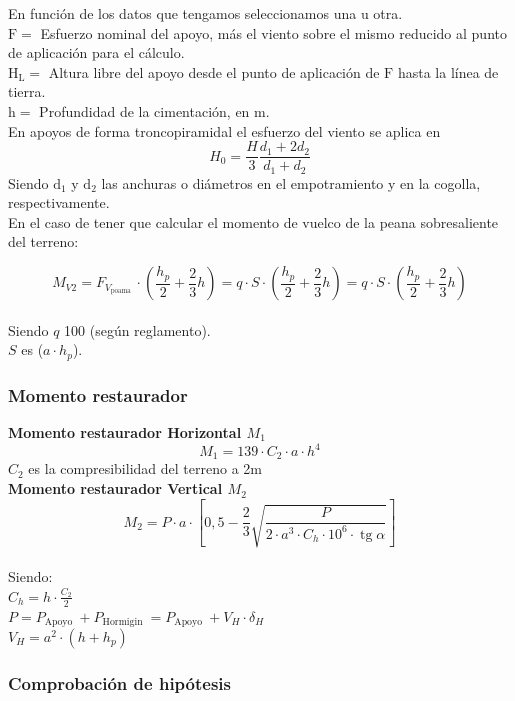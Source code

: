 \documentclass{article}
\begin{document}
En función de los datos que tengamos seleccionamos una u otra.
\\

$\mathrm{F}=$ Esfuerzo nominal del apoyo, más el viento sobre el mismo reducido al punto de aplicación para el cálculo.
\\

$\mathrm{H}_{\mathrm{L}}=$ Altura libre del apoyo desde el punto de aplicación de $\mathrm{F}$ hasta la línea de tierra.
\\

$\mathrm{h}=$ Profundidad de la cimentación, en $\mathrm{m}$.
\\

En apoyos de forma troncopiramidal el esfuerzo del viento se aplica en
$$
H_{0}=\frac{H}{3} \frac{d_{1}+2 d_{2}}{d_{1}+d_{2}}
$$
Siendo $\mathrm{d}_{1}$ y $\mathrm{d}_{2}$ las anchuras o diámetros en el empotramiento y en la cogolla, respectivamente.
\\

En el caso de tener que calcular el momento de vuelco de la peana sobresaliente del terreno:

$$M_{V 2}=F_{V_{\text {poama }}} \cdot\left(\frac{h_{p}}{2}+\frac{2}{3} h\right)=q \cdot S \cdot\left(\frac{h_{p}}{2}+\frac{2}{3} h\right)=q \cdot S \cdot\left(\frac{h_{p}}{2}+\frac{2}{3} h\right)$$
\\
Siendo $q$ 100 (según reglamento).
\\
$S$ es ($a \cdot h_p$).
\newpage
\subsubsection{Momento restaurador}
\textbf{Momento restaurador Horizontal $M_1$}
$$M_{1}=139 \cdot C_{2} \cdot a \cdot h^{4}$$
$C_2$ es la compresibilidad del terreno a 2m
\\

\textbf{Momento restaurador Vertical $M_2$}
$$M_{2}=P \cdot a \cdot\left[0,5-\frac{2}{3} \sqrt{\frac{P}{2 \cdot a^{3} \cdot C_{h} \cdot 10^{6} \cdot \operatorname{tg} \alpha}}\right]$$
\\
Siendo:
\\
$C_{h}=h \cdot \frac{C_{2}}{2}$\\

$P=P_{\text {Apoyo }}+P_{\text {Hormigin }}=P_{\text {Apoyo }}+V_{H} \cdot \delta_{H}$ \\

$V_{H}=a^{2} \cdot\left(h+h_{p}\right)$

\subsubsection{Comprobación de hipótesis}
\\
\end{document}
